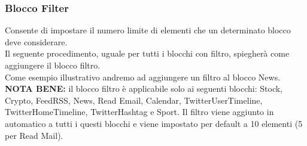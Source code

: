 \subsubsection{Blocco Filter} \label{filter}
Consente di impostare il numero limite di elementi che un determinato blocco deve considerare. \\
Il seguente procedimento, uguale per tutti i blocchi con filtro, spiegherà come aggiungere il blocco filtro. \\
Come esempio illustrativo andremo ad aggiungere un filtro al blocco News. \\
\textbf{NOTA BENE:} il blocco filtro è applicabile solo ai seguenti blocchi: Stock, Crypto, FeedRSS, News, Read Email, Calendar, TwitterUserTimeline, TwitterHomeTimeline, TwitterHashtag e Sport. Il filtro viene aggiunto in automatico a tutti i questi blocchi e viene impostato per default a 10 elementi (5 per Read Mail).
\newpage
